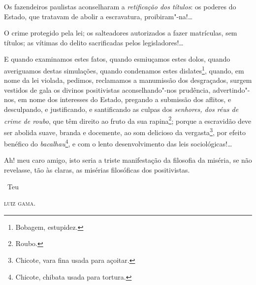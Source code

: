 Os fazendeiros paulistas aconselharam a \emph{retificação dos títulos}:
os poderes do Estado, que tratavam de abolir a escravatura,
proibiram"-na!\ldots{}

O crime protegido pela lei; os salteadores autorizados a fazer
matrículas, sem títulos; as vítimas do delito sacrificadas pelos
legisladores!\ldots{}

E quando examinamos estes fatos, quando esmiuçamos estes dolos, quando
averiguamos destas simulações, quando condenamos estes
dislates\footnote{Bobagem, estupidez.}, quando, em nome da lei
violada, pedimos, reclamamos a manumissão dos desgraçados, surgem
vestidos de gala os divinos positivistas aconselhando"-nos prudência,
advertindo"-nos, em nome dos interesses do Estado, pregando a submissão
dos aflitos, e desculpando, e justificando, e santificando as culpas dos
\emph{senhores, dos réus de crime de roubo}, que têm direito ao fruto da
sua rapina\footnote{Roubo.}; porque a escravidão deve ser abolida
suave, branda e docemente, ao som delicioso da vergasta\footnote{
  Chicote, vara fina usada para açoitar.}, por efeito benéfico do
\emph{bacalhau}\footnote{Chicote, chibata usada para tortura.},
e com o lento
desenvolvimento das leis sociológicas!\ldots{}

Ah! meu caro amigo, isto seria a triste manifestação da filosofia da
miséria, se não revelasse, tão às claras, as misérias filosóficas dos
positivistas.

\bigskip

\hfill\ Teu

\hfill\textsc{luiz gama}.

\paginabranca
\mbox{}\vfill
\thispagestyle{empty}

